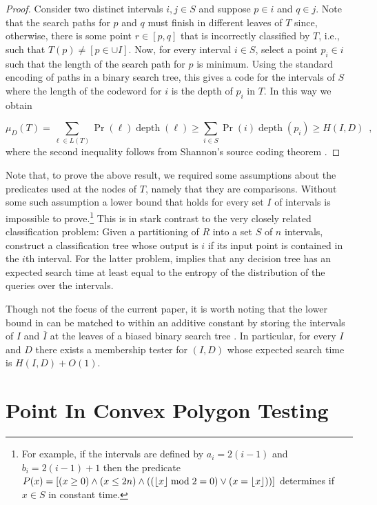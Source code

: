 \documentclass[charterfonts,lotsofwhite]{patmorin}
\DeclareMathOperator{\depth}{depth}
\begin{document}
\begin{proof}
Consider two distinct intervals $i,j\in S$ and suppose $p\in i$ and
$q\in j$.  Note that the search paths for $p$ and $q$ must finish in
different leaves of $T$ since, otherwise, there is some point
$r\in[p,q]$ that is incorrectly classified by $T$, i.e., such
that $T(p)\neq [p\in\cup I]$.  Now, for every interval $i\in S$,
select a point $p_i\in i$ such that the length of the search path for
$p$ is minimum.   Using the standard encoding of paths in a binary
search tree, this gives a code for the intervals of $S$ where the
length of the codeword for $i$ is the depth of $p_i$ in $T$.  In this
way we obtain

\[
   \mu_D(T)
    = \sum_{\ell\in L(T)} \Pr(\ell)\depth(\ell)
   \ge \sum_{i \in S} \Pr(i)\depth(p_i)
   \ge H(I,D)
   \enspace , 
\]
where the second inequality follows from Shannon's source coding
theorem \cite{X}.
\end{proof}

Note that, to prove the above result, we required some assumptions
about the predicates used at the nodes of $T$, namely that they are
comparisons.  Without some such assumption a lower bound that holds
for every set $I$ of intervals is impossible to prove.\footnote{For
example, if the intervals are defined by $a_i=2(i-1)$ and
$b_i=2(i-1)+1$ then the predicate $P(x)=[(x\ge 0)\wedge(x\le
2n)\wedge((\left\lfloor x \right\rfloor\bmod 2=0)\vee(x=\left\lfloor x \right\rfloor))]$ determines if $x\in
S$ in constant time.} This is in stark contrast to the very closely
related classification problem: Given a partitioning of $R$ into a set
$S$ of $n$ intervals, construct a classification tree whose output is
$i$ if its input point is contained in the $i$th interval.  For the
latter problem,  implies that any decision tree has an
expected search time at least equal to the entropy of the distribution
of the queries over the intervals. 

Though not the focus of the current paper, it is worth noting that the
lower bound in  can be matched to within an additive
constant by storing the intervals of $I$ and $\overline{I}$ at the
leaves of a biased binary search tree \cite{kXX,mXX}.  In particular,
for every $I$ and $D$ there exists a membership tester for $(I,D)$
whose expected search time is $H(I,D)+O(1)$.

\section{Point In Convex Polygon Testing}
\end{document}
